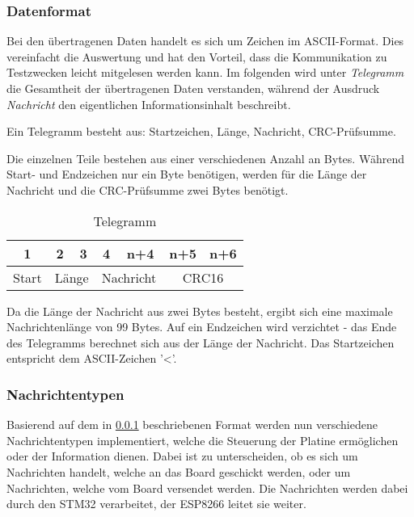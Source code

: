 \newpage

\subsubsection{Datenformat}
\label{subsub: Datenformat}

Bei den übertragenen Daten handelt es sich um Zeichen im \acs{ASCII}-Format. Dies vereinfacht die Auswertung und hat den Vorteil, dass die Kommunikation
zu Testzwecken leicht mitgelesen werden kann. Im folgenden wird unter \textit{Telegramm} die Gesamtheit der übertragenen Daten verstanden, während 
der Ausdruck \textit{Nachricht} den eigentlichen Informationsinhalt beschreibt.

\smallskip

Ein Telegramm besteht aus: Startzeichen, Länge, Nachricht, CRC-Prüfsumme.

\smallskip

Die einzelnen Teile bestehen aus einer verschiedenen Anzahl an Bytes. Während Start- und Endzeichen nur ein Byte benötigen, werden für die
Länge der Nachricht und die CRC-Prüfsumme zwei Bytes benötigt.

\smallskip

\begin{wraptable}{r}{75mm} 
    
    \begin{tabular}{ |c | c | c | c | c | c | c | }
        \hline
        1 & 2 & 3 & 4 & n+4 & n+5 & n+6  \\
        \hline \hline
        Start  & \multicolumn{2}{|c|}{Länge} & \multicolumn{2}{|c|}{Nachricht} & \multicolumn{2}{|c|}{CRC16} \\
        \hline
    
      \end{tabular}
    \centering
    \caption{Telegramm}
    \end{wraptable}


Da die Länge der Nachricht aus zwei Bytes besteht, ergibt sich eine maximale Nachrichtenlänge von 99 Bytes. Auf ein Endzeichen wird verzichtet - 
das Ende des Telegramms berechnet sich aus der Länge der Nachricht. Das Startzeichen entspricht dem \acs{ASCII}-Zeichen '<'.

\subsubsection{Nachrichtentypen}
\label{subsub: Nachricht}

Basierend auf dem in \ref{subsub: Datenformat} beschriebenen Format werden nun verschiedene Nachrichtentypen implementiert, welche die Steuerung
der Platine ermöglichen oder der Information dienen. Dabei ist zu unterscheiden, ob es sich um Nachrichten handelt, welche an das Board geschickt werden,
oder um Nachrichten, welche vom Board versendet werden.
Die Nachrichten werden dabei durch den STM32 verarbeitet, der ESP8266 leitet sie weiter. 

